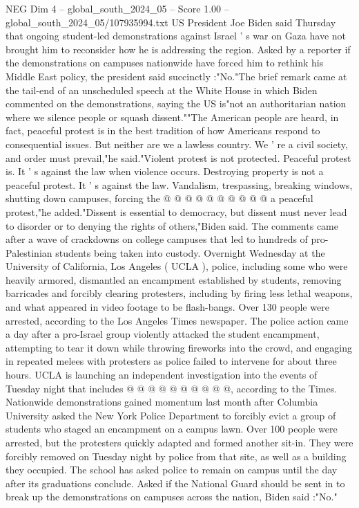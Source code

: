 \begin{textsample}{NEG Dim 4 – global\_south\_2024\_05 – Score 1.00 – global\_south\_2024\_05/107935994.txt}  \label{ex:f4_neg_274}
US President Joe Biden said Thursday that ongoing student-led demonstrations against Israel ' s war on Gaza have not brought him to reconsider how he is addressing the region.
Asked by a reporter if the demonstrations on campuses nationwide have forced him to rethink his Middle East policy, the president said succinctly :"No."The brief remark came at the tail-end of an unscheduled speech at the White House in which Biden commented on the demonstrations, saying the US is"not an authoritarian nation where we silence people or squash dissent.""The American people are heard, in fact, peaceful protest is in the best tradition of how Americans respond to consequential issues.
But neither are we a lawless country.
We ' re a civil society, and order must prevail,"he said."Violent protest is not protected.
Peaceful protest is.
It ' s against the law when violence occurs.
Destroying property is not a peaceful protest.
It ' s against the law.
Vandalism, trespassing, breaking windows, shutting down campuses, forcing the @ @ @ @ @ @ @ @ @ @ a peaceful protest,"he added."Dissent is essential to democracy, but dissent must never lead to disorder or to denying the rights of others,"Biden said.
The comments came after a wave of crackdowns on college campuses that led to hundreds of pro-Palestinian students being taken into custody.
Overnight Wednesday at the University of California, Los Angeles ( UCLA ), police, including some who were heavily armored, dismantled an encampment established by students, removing barricades and forcibly clearing protesters, including by firing less lethal weapons, and what appeared in video footage to be flash-bangs.
Over 130 people were arrested, according to the Los Angeles Times newspaper.
The police action came a day after a pro-Israel group violently attacked the student encampment, attempting to tear it down while throwing fireworks into the crowd, and engaging in repeated melees with protesters as police failed to intervene for about three hours.
UCLA is launching an independent investigation into the events of Tuesday night that includes @ @ @ @ @ @ @ @ @ @, according to the Times.
Nationwide demonstrations gained momentum last month after Columbia University asked the New York Police Department to forcibly evict a group of students who staged an encampment on a campus lawn.
Over 100 people were arrested, but the protesters quickly adapted and formed another sit-in.
They were forcibly removed on Tuesday night by police from that site, as well as a building they occupied.
The school has asked police to remain on campus until the day after its graduations conclude.
Asked if the National Guard should be sent in to break up the demonstrations on campuses across the nation, Biden said :"No."

\end{textsample}
